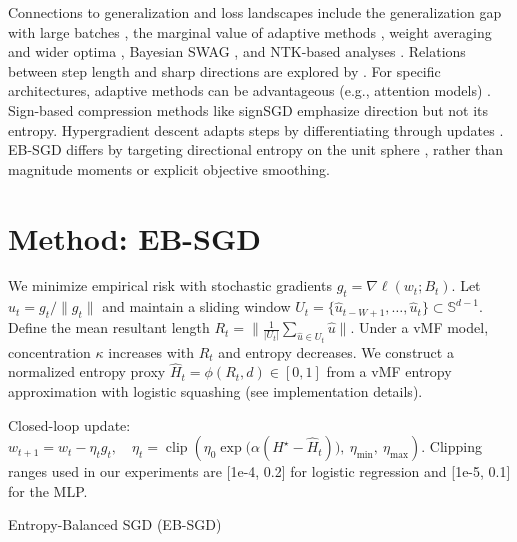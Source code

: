Connections to generalization and loss landscapes include the generalization gap with large batches \cite{Keskar2017LargeBatchICLR}, the marginal value of adaptive methods \cite{Wilson2017MarginalValueNeurIPS}, weight averaging and wider optima \cite{Izmailov2018SWAUAI}, Bayesian SWAG \cite{Maddox2019SWAGNeurIPS}, and NTK-based analyses \cite{Jacot2018NTKNeurIPS}. Relations between step length and sharp directions are explored by \cite{Jastrzebski2018SharpestSGD}. For specific architectures, adaptive methods can be advantageous (e.g., attention models) \cite{Zhang2019WhyAdamAttention}. Sign-based compression methods like signSGD \cite{Bernstein2018signSGDICML} emphasize direction but not its entropy. Hypergradient descent adapts steps by differentiating through updates \cite{Baydin2018HypergradientICLR}. EB-SGD differs by targeting directional entropy on the unit sphere \cite{MardiaJupp2000Directional,Banerjee2005vMFJMLR}, rather than magnitude moments or explicit objective smoothing.

\section{Method: EB-SGD}
We minimize empirical risk with stochastic gradients $g_t=\nabla \ell(w_t;B_t)$. Let $\hat{u}_t=g_t/\|g_t\|$ and maintain a sliding window $U_t=\{\hat{u}_{t-W+1},\dots,\hat{u}_t\}\subset\mathbb{S}^{d-1}$. Define the mean resultant length
$
R_t=\Big\|\frac{1}{|U_t|}\sum_{\hat{u}\in U_t}\hat{u}\Big\|.
$
Under a vMF model, concentration $\kappa$ increases with $R_t$ and entropy decreases. We construct a normalized entropy proxy $\widehat{H}_t=\phi(R_t,d)\in[0,1]$ from a vMF entropy approximation with logistic squashing (see implementation details).

Closed-loop update:
$
w_{t+1}=w_t-\eta_t g_t,\quad
\eta_t=\operatorname{clip}\left(\eta_0\exp\big(\alpha(H^\star-\widehat{H}_t)\big),~\eta_{\min},~\eta_{\max}\right).
$
Clipping ranges used in our experiments are [1e-4, 0.2] for logistic regression and [1e-5, 0.1] for the MLP.

\begin{adjustbox}{width=\linewidth}
\begin{algorithm}[H]
\DontPrintSemicolon
\SetAlgoLined
{}
\caption{Entropy-Balanced SGD (EB-SGD)}
\end{algorithm}
\end{adjustbox}

